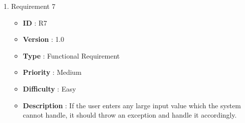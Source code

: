 \documentclass[12pt, a4paper]{article}
\begin{document}
\begin{enumerate}
    \newpage
    
    \item{} Requirement 7
        \begin{itemize}
        \item \textbf{ID} : R7
        \item \textbf{Version} : 1.0
        \item \textbf{Type} : Functional Requirement
        \item \textbf{Priority} : Medium
        \item \textbf{Difficulty} : Easy
        \item \textbf{Description} : If the user enters any large input value which the system cannot handle, it should throw an exception and handle it accordingly.
        \end{itemize}
\end{enumerate}
\end{document}
